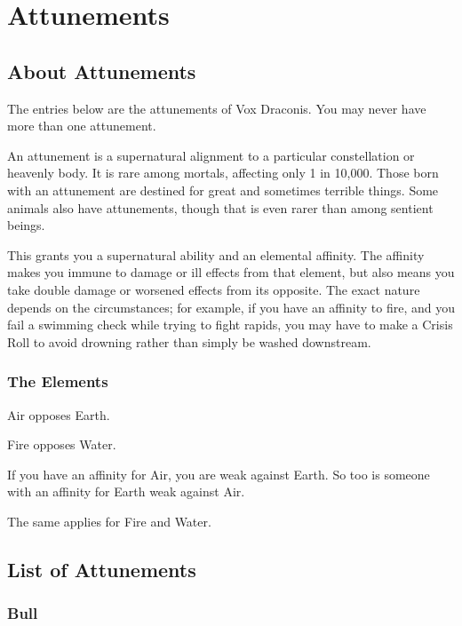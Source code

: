 \chapter{Attunements}

\begin{multicols}{2}

\section{About Attunements}

The entries below are the attunements of Vox Draconis. You may 
never have more than one attunement.

An attunement is a supernatural alignment to a particular 
constellation or heavenly body. It is rare among mortals, 
affecting only 1 in 10,000. Those born with an attunement 
are destined for great and sometimes terrible things. Some 
animals also have attunements, though that is even rarer than 
among sentient beings.

This grants you a supernatural ability and an elemental affinity.
The affinity  makes you immune to damage or
ill effects from that element, but also means you take double
damage or worsened effects from its opposite. The exact nature
depends on the circumstances; for example, if you have an
affinity to fire, and you fail a swimming check while trying to fight
rapids, you may have to make a Crisis Roll to avoid drowning
rather than simply be washed downstream.

\subsection{The Elements}

Air opposes Earth.

Fire opposes Water.

If you have an affinity for Air, you are weak against Earth. So
too is someone with an affinity for Earth weak against Air.

The same applies for Fire and Water.

\section{List of Attunements}

\subsection{Bull}


\end{multicols}
